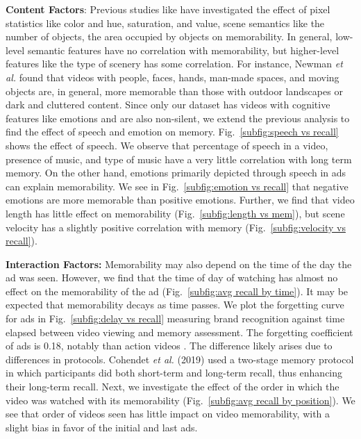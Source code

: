 \textbf{Content Factors}: %
Previous studies like \cite{isola2011makes,newman2020multimodal} have investigated the effect of pixel statistics like color and hue, saturation, and value, scene semantics like the number of objects, the area occupied by objects on memorability. In general, low-level semantic features have no correlation with memorability, but higher-level features like the type of scenery has some correlation. For instance, Newman \textit{et al.} \cite{newman2020multimodal} found that videos with
people, faces, hands, man-made spaces, and moving objects are, in general, more memorable than those with outdoor landscapes or dark and cluttered content. Since only our dataset has videos with cognitive features like emotions and are also non-silent, we extend the previous analysis to find the effect of speech and emotion on memory. Fig.~\ref{subfig:speech vs recall} shows the effect of speech. We observe that percentage of speech in a video, presence of music, and type of music have a very little correlation with long term memory. On the other hand, emotions primarily depicted through speech in ads can explain memorability. We see in Fig.~\ref{subfig:emotion vs recall} that negative emotions are more memorable than positive emotions. Further, %
we find that video length has little effect on memorability (Fig.~\ref{subfig:length vs mem}), but scene velocity has a slightly positive correlation with memory (Fig.~\ref{subfig:velocity vs recall}).



\textbf{Interaction Factors:} Memorability may also depend on the time of the day the ad was seen. However, we find that the time of day of watching has almost no effect on the memorability of the ad (Fig.~\ref{subfig:avg recall by time}). It may be expected that memorability decays as time passes. We plot the forgetting curve for ads in Fig.~\ref{subfig:delay vs recall} measuring brand recognition against time elapsed between video viewing and memory assessment. The forgetting coefficient of ads is 0.18, notably than action videos \cite{cohendet2019videomem}. The difference likely arises due to differences in protocols. Cohendet \textit{et al.} (2019) \cite{cohendet2019videomem} used a two-stage memory protocol in which participants did both short-term and long-term recall, thus enhancing their long-term recall. 
Next, we investigate the effect of the order in which the video was watched with its memorability (Fig.~\ref{subfig:avg recall by position}). We see that order of videos seen has little impact on video memorability, with a slight bias in favor of the initial and last ads. %





